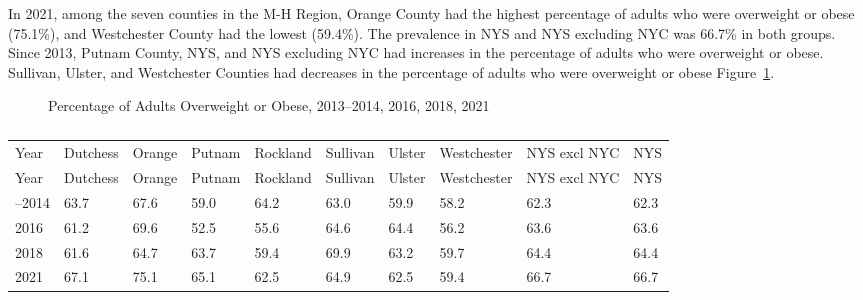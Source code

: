 \documentclass[
  english,
  letterpaper,
]{report}
\begin{document}
In 2021, among the seven counties in the M-H Region, Orange County had
the highest percentage of adults who were overweight or obese (75.1\%),
and Westchester County had the lowest (59.4\%). The prevalence in NYS
and NYS excluding NYC was 66.7\% in both groups. Since 2013, Putnam
County, NYS, and NYS excluding NYC had increases in the percentage of
adults who were overweight or obese. Sullivan, Ulster, and Westchester
Counties had decreases in the percentage of adults who were overweight
or obese Figure~\ref{fig-adult-oando-percent}.

\begin{figure}


\caption{\label{fig-adult-oando-percent}Percentage of Adults Overweight
or Obese, 2013--2014, 2016, 2018, 2021}

\end{figure}%

\begin{longtable}[]{@{}llllllllll@{}}

\caption{\label{tbl-adult-oando-percent}Percentage of Adults Overweight
or Obese, 2013--2014, 2016, 2018, 2021}

\tabularnewline

\caption{}\label{T_8694f}\tabularnewline
\toprule\noalign{}
Year & Dutchess & Orange & Putnam & Rockland & Sullivan & Ulster &
Westchester & NYS excl NYC & NYS \\
\midrule\noalign{}
\endfirsthead
\toprule\noalign{}
Year & Dutchess & Orange & Putnam & Rockland & Sullivan & Ulster &
Westchester & NYS excl NYC & NYS \\
\midrule\noalign{}
\endhead
\bottomrule\noalign{}
\endlastfoot
2013--2014 & 63.7 & 67.6 & 59.0 & 64.2 & 63.0 & 59.9 & 58.2 & 62.3 &
62.3 \\
2016 & 61.2 & 69.6 & 52.5 & 55.6 & 64.6 & 64.4 & 56.2 & 63.6 & 63.6 \\
2018 & 61.6 & 64.7 & 63.7 & 59.4 & 69.9 & 63.2 & 59.7 & 64.4 & 64.4 \\
2021 & 67.1 & 75.1 & 65.1 & 62.5 & 64.9 & 62.5 & 59.4 & 66.7 & 66.7 \\

\end{longtable}
\end{document}
